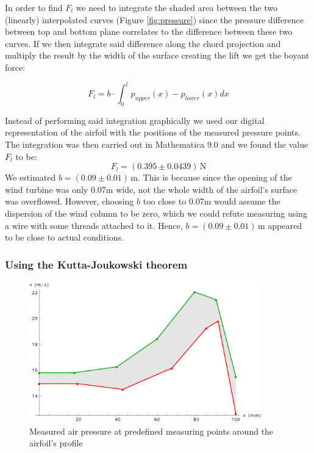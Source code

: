 \documentclass{scrreprt}
\newcommand{\unit}[1]{\ensuremath{\, \mathrm{#1}}}
\begin{document}
In order to find $F_l$ we need to integrate the shaded area between the two (linearly) interpolated curves (Figure \ref{fig:pressure}) since the pressure difference between top and bottom plane correlates to the difference between these two curves. If we then integrate said difference along the chord projection and multiply the result by the width of the surface creating the lift we get the boyant force:

\begin{equation}
F_l = b \cdot \int_0^l{p_{upper}(x)-p_{lower}(x)dx}
\end{equation}

Instead of performing said integration graphically we used our digital representation of the airfoil with the positions of the measured pressure points. The integration was then carried out in Mathematica 9.0 and we found the value $F_l$ to be:
\[F_l = (0.395 \pm 0.0439) \unit{N}\]
We estimated $b=(0.09 \pm 0.01)\unit{m}$. This is because since the opening of the wind turbine was only 0.07m wide, not the whole width of the airfoil's surface was overflowed. However, choosing $b$ too close to 0.07m would assume the dispersion of the wind column to be zero, which we could refute measuring using a wire with some threads attached to it. Hence, $b=(0.09 \pm 0.01)\unit{m}$ appeared to be close to actual conditions.


\subsubsection{Using the Kutta-Joukowski theorem}

\begin{figure}[H]
	\centering
  \includegraphics[width=0.9\textwidth]{diag/kutta-joukowsky.pdf}
	\caption{Measured air pressure at predefined measuring points around the airfoil's profile}
	\label{fig:kutta}
\end{figure}
\end{document}
